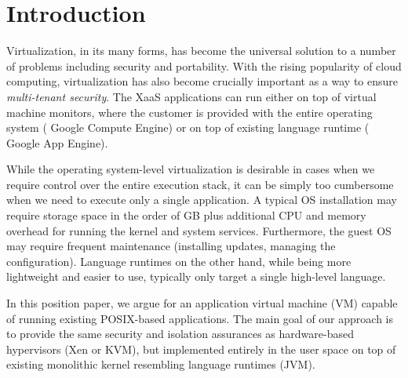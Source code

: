 \section{Introduction}
\label{sec:intro}



Virtualization, in its many forms, has become the universal solution to
a number of problems including security and portability.  With the
rising popularity of cloud computing, virtualization has also become
crucially important as a way to ensure \emph{multi-tenant security}. The
XaaS applications can run either on top of virtual machine monitors,
where the customer is provided with the entire operating system (\eg
Google Compute Engine) or on top of existing language runtime (\eg
Google App Engine).

While the operating system-level virtualization is desirable in cases
when we require control over the entire execution stack, it can be
simply too cumbersome when we need to execute only a single application.
A typical OS installation may require storage space in the order of GB
plus additional CPU and memory overhead for running the kernel and
system services. Furthermore, the guest OS may require frequent
maintenance (\eg installing updates, managing the configuration).
Language runtimes on the other hand, while being more lightweight and
easier to use, typically only target a single high-level language. 

In this position paper, we argue for an application virtual machine (VM)
capable of running existing POSIX-based applications. The main goal of
our approach is to provide the same security and isolation assurances as
hardware-based hypervisors (\eg Xen or KVM), but implemented entirely in
the user space on top of existing monolithic kernel resembling language
runtimes (\eg JVM).



